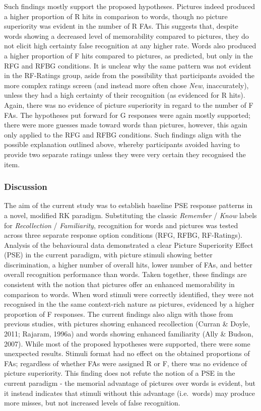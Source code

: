 \documentclass[
  11pt,
]{article}
\begin{document}
Such findings mostly support the proposed hypotheses. Pictures indeed
produced a higher proportion of R hits in comparison to words, though no
picture superiority was evident in the number of R FAs. This suggests
that, despite words showing a decreased level of memorability compared
to pictures, they do not elicit high certainty false recognition at any
higher rate. Words also produced a higher proportion of F hits compared
to pictures, as predicted, but only in the RFG and RFBG conditions. It
is unclear why the same pattern was not evident in the RF-Ratings group,
aside from the possibility that participants avoided the more complex
ratings screen (and instead more often chose \emph{New}, inaccurately),
unless they had a high certainty of their recognition (as evidenced for
R hits). Again, there was no evidence of picture superiority in regard
to the number of F FAs. The hypotheses put forward for G responses were
again mostly supported; there were more guesses made toward words than
pictures, however, this again only applied to the RFG and RFBG
conditions. Such findings align with the possible explanation outlined
above, whereby participants avoided having to provide two separate
ratings unless they were very certain they recognised the item.

\hypertarget{discussion}{%
\subsubsection{Discussion}\label{discussion}}

\hfill\break The aim of the current study was to establish baseline PSE
response patterns in a novel, modified RK paradigm. Substituting the
classic \emph{Remember} / \emph{Know} labels for \emph{Recollection} /
\emph{Familiarity}, recognition for words and pictures was tested across
three separate response option conditions (RFG, RFBG, RF-Ratings).
Analysis of the behavioural data demonstrated a clear Picture
Superiority Effect (PSE) in the current paradigm, with picture stimuli
showing better discrimination, a higher number of overall hits, lower
number of FAs, and better overall recognition performance than words.
Taken together, these findings are consistent with the notion that
pictures offer an enhanced memorability in comparison to words. When
word stimuli were correctly identified, they were not recognised in the
the same context-rich nature as pictures, evidenced by a higher
proportion of F responses. The current findings also align with those
from previous studies, with pictures showing enhanced recollection
(Curran \& Doyle, 2011; Rajaram, 1996a) and words showing enhanced
familiarity (Ally \& Budson, 2007). While most of the proposed
hypotheses were supported, there were some unexpected results. Stimuli
format had no effect on the obtained proportions of FAs; regardless of
whether FAs were assigned R or F, there was no evidence of picture
superiority. This finding does not refute the notion of a PSE in the
current paradigm - the memorial advantage of pictures over words is
evident, but it instead indicates that stimuli without this advantage
(i.e.~words) may produce more misses, but not increased levels of false
recognition.
\end{document}
